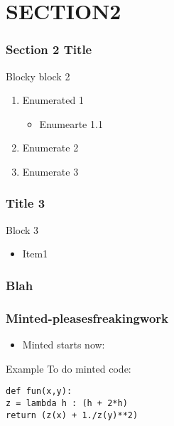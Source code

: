 \documentclass{beamer}
\begin{document}
\section{SECTION2}
\begin{frame}
    \frametitle{Section 2 Title}
    \begin{block}{Blocky block 2}
        \begin{enumerate}
            \item Enumerated 1
                \begin{itemize}
                    \item Enumearte 1.1
                \end{itemize}
            \item Enumerate 2
            \item Enumerate 3
        \end{enumerate}
    \end{block}
\end{frame}

\begin{frame}
    \frametitle{Title 3}
    \begin{block}{Block 3}
        \begin{itemize}
            \item Item1
        \end{itemize}
    \end{block}
\end{frame}

\begin{frame}
    \frametitle{Blah}
\end{frame}


\begin{frame} [fragile]
    \frametitle{Minted-pleasesfreakingwork}
    \begin{itemize}
        \item Minted starts now:
    \end{itemize}
    \begin{block}{Example}
    To do minted code:
        \begin{verbatim}
def fun(x,y):
z = lambda h : (h + 2*h)
return (z(x) + 1./z(y)**2)

        \end{verbatim}
    \end{block}
\end{frame}

\end{document}
